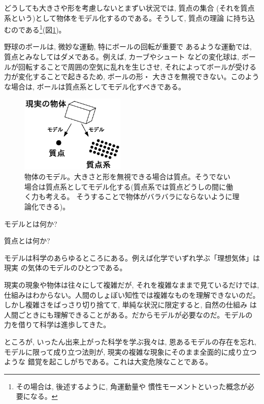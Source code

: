 どうしても大きさや形を考慮しないとまずい状況では, 質点の集合
(それを質点系という)として物体をモデル化するのである。そうして, 質点の理論
に持ち込むのである\footnote{その場合は, 後述するように, 角運動量や
慣性モーメントといった概念が必要になる。}(図\ref{fig:particle})。\mv

\begin{exmpl} 野球のボールは, 微妙な運動, 特にボールの回転が重要で
あるような運動では, 質点とみなしてはダメである。例えば, カーブやシュート
などの変化球は, ボールが回転することで周囲の空気に乱れを生じさせ, 
それによってボールが受ける力が変化することで起きるため, ボールの形・
大きさを無視できない。このような場合は, ボールは質点系としてモデル化すべきである。
\end{exmpl}

\begin{figure}[h]
    \centering
    \includegraphics[width=5cm]{particle.eps}
    \caption{物体のモデル。大きさと形を無視できる場合は質点。そうでない
場合は質点系としてモデル化する(質点系では質点どうしの間に働く力も考える。
そうすることで物体がバラバラにならないように理論化できる)。}\label{fig:particle}
\end{figure}

\begin{q}\label{q:whatis_model}
モデルとは何か?
\end{q}

\begin{q}\label{q:whatis_particle}
質点とは何か?
\end{q}

モデルは科学のあらゆるところにある。例えば化学でいずれ学ぶ「理想気体」は現実
の気体のモデルのひとつである。

現実の現象や物体は往々にして複雑だが, それを複雑なままで見ているだけでは, 
仕組みはわからない。人間のしょぼい知性では複雑なものを理解できないのだ。
しかし複雑さをばっさり切り捨てて, 単純な状況に限定すると, 自然の仕組み
は人間ごときにも理解できることがある。だからモデルが必要なのだ。モデルの
力を借りて科学は進歩してきた。

ところが, いったん出来上がった科学を学ぶ我々は, 恩あるモデルの存在を忘れ, 
モデルに限って成り立つ法則が, 現実の複雑な現象にそのまま全面的に成り立つような
錯覚を起こしがちである。これは大変危険なことである。

